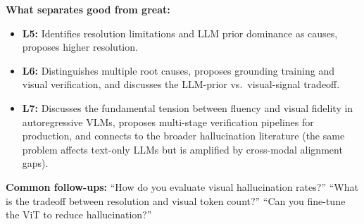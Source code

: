 \begin{interviewq}
\textbf{What separates good from great:}
\begin{itemize}
    \item \textbf{L5:} Identifies resolution limitations and LLM prior dominance as causes, proposes higher resolution.
    \item \textbf{L6:} Distinguishes multiple root causes, proposes grounding training and visual verification, and discusses the LLM-prior vs.\ visual-signal tradeoff.
    \item \textbf{L7:} Discusses the fundamental tension between fluency and visual fidelity in autoregressive VLMs, proposes multi-stage verification pipelines for production, and connects to the broader hallucination literature (the same problem affects text-only LLMs but is amplified by cross-modal alignment gaps).
\end{itemize}

\textbf{Common follow-ups:} ``How do you evaluate visual hallucination rates?'' ``What is the tradeoff between resolution and visual token count?'' ``Can you fine-tune the ViT to reduce hallucination?''
\end{interviewq}


